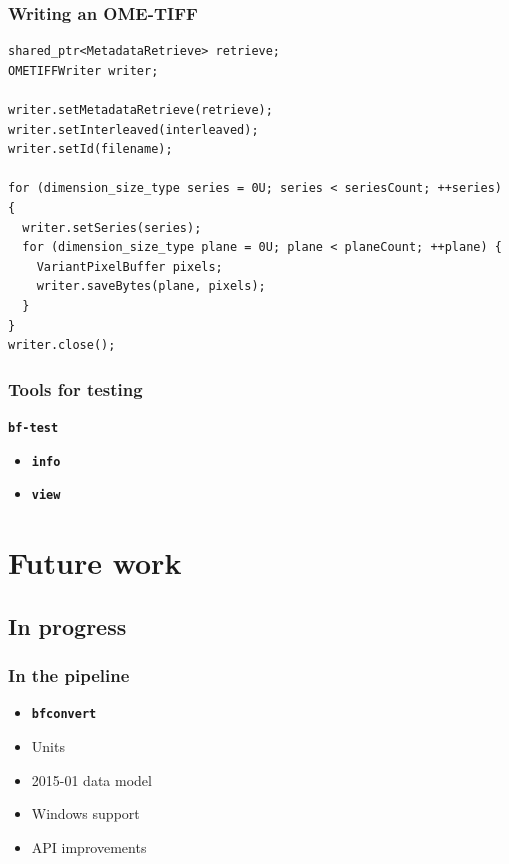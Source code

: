 \documentclass{beamer}
\newcommand{\cmd}[1]{\textbf{\texttt{#1}}}
\begin{document}
\begin{frame}[fragile]
  \frametitle{Writing an OME-TIFF}
  \begin{lstlisting}
shared_ptr<MetadataRetrieve> retrieve;
OMETIFFWriter writer;

writer.setMetadataRetrieve(retrieve);
writer.setInterleaved(interleaved);
writer.setId(filename);

for (dimension_size_type series = 0U; series < seriesCount; ++series) {
  writer.setSeries(series);
  for (dimension_size_type plane = 0U; plane < planeCount; ++plane) {
    VariantPixelBuffer pixels;
    writer.saveBytes(plane, pixels);
  }
}
writer.close();
  \end{lstlisting}
\end{frame}

\begin{frame}
  \frametitle{Tools for testing}
  \begin{block}{\cmd{bf-test}}
    \begin{itemize}
      \item \cmd{info}
      \item \cmd{view}
    \end{itemize}
  \end{block}
\end{frame}

\section{Future work}
\subsection{In progress}

\begin{frame}
  \frametitle{In the pipeline}
  \begin{itemize}
  \item \cmd{bfconvert}
  \item Units
  \item 2015-01 data model
  \item Windows support
  \item API improvements
  \end{itemize}
\end{frame}
\end{document}
